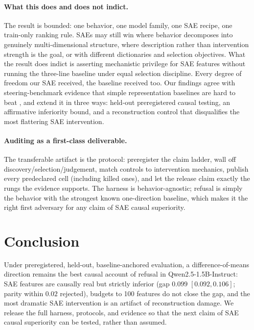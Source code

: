 \documentclass[11pt]{article}
\begin{document}
\paragraph{What this does and does not indict.}
The result is bounded: one behavior, one model family, one SAE recipe, one
train-only ranking rule.  SAEs may still win where behavior decomposes into
genuinely multi-dimensional structure, where description rather than
intervention strength is the goal, or with different dictionaries and
selection objectives.  What the result does indict is asserting mechanistic
privilege for SAE features without running the three-line baseline under
equal selection discipline.  Every degree of freedom our SAE received, the
baseline received too.  Our findings agree with steering-benchmark evidence
that simple representation baselines are hard to beat \citep{wu2025axbench},
and extend it in three ways: held-out preregistered causal testing, an
affirmative inferiority bound, and a reconstruction control that disqualifies
the most flattering SAE intervention.

\paragraph{Auditing as a first-class deliverable.}
The transferable artifact is the protocol: preregister the claim ladder, wall
off discovery/selection/judgement, match controls to intervention mechanics,
publish every predeclared cell (including killed ones), and let the release
claim exactly the rungs the evidence supports.  The harness is
behavior-agnostic; refusal is simply the behavior with the strongest known
one-direction baseline, which makes it the right first adversary for any
claim of SAE causal superiority.

\section{Conclusion}
\label{sec:conclusion}

Under preregistered, held-out, baseline-anchored evaluation, a
difference-of-means direction remains the best causal account of refusal in
Qwen2.5-1.5B-Instruct: SAE features are causally real but strictly inferior
(gap $0.099$ $[0.092,0.106]$; parity within $0.02$ rejected), budgets to 100
features do not close the gap, and the most dramatic SAE intervention is an
artifact of reconstruction damage.  We release the full harness, protocols,
and evidence so that the next claim of SAE causal superiority can be tested,
rather than assumed.
\end{document}
